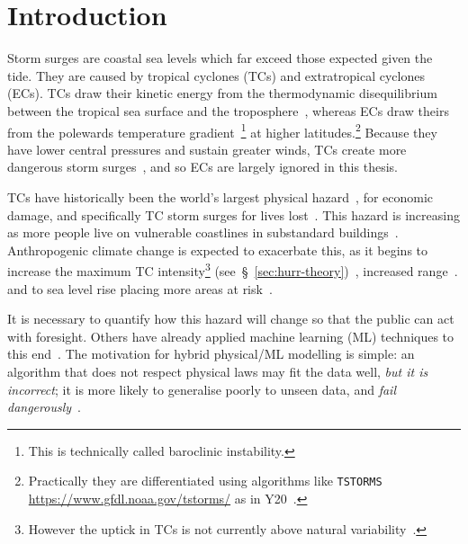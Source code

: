 \section{Introduction}
\label{sec:1_Introduction}


Storm surges are coastal sea levels which far exceed those
expected given the tide.
They are caused by tropical cyclones
(TCs) and extratropical cyclones (ECs).
TCs draw their kinetic energy from the thermodynamic disequilibrium between
the tropical sea surface and the
troposphere~\cite{emanuel1986air, emanuel1987dependence},
whereas ECs draw theirs from the
polewards temperature
gradient~\cite{lorenz1960energy, holton2004introduction}\footnote{
This is technically called baroclinic instability.} at higher latitudes.\footnote{
Practically they are differentiated using algorithms like \texttt{TSTORMS}
\url{https://www.gfdl.noaa.gov/tstorms/} as in Y20~\cite{ZannaPreprint}.}
Because they have lower central pressures and sustain greater winds,
TCs create more dangerous storm surges~\cite{emanuel2005divine},
and so ECs are largely ignored in this thesis.

TCs have historically been the
world's largest physical hazard~\cite{shultz2005epidemiology},
for economic damage,
and specifically TC storm surges for lives lost~\cite{emanuel2005divine,
shultz2005epidemiology, zhang2009tropical}.
This hazard is increasing as more people live on vulnerable coastlines
in substandard buildings~\cite{emanuel2005divine}.
Anthropogenic climate change is expected to exacerbate this,
as it begins to increase the maximum TC intensity\footnote{
However the uptick in TCs is not currently above
 natural variability~\cite{mendelsohn2012impact}.}
(see~§~\ref{sec:hurr-theory})~\cite{
emanuel2008hurricanes,emanuel2017will, nordhaus2010},
increased range~\cite{emanuel2008hurricanes, emanuel2017will, fedorov2010tropical}.
and to sea level rise placing more areas at risk~\cite{SROCC}.

It is necessary to quantify how this hazard will change
so that the public can act with foresight.
Others have already applied machine learning (ML) techniques to this
end~\cite{kulp2019new, kulp2018coastaldem, tadesse2020data}.
The motivation for hybrid physical/ML modelling is simple:
an algorithm that does not respect physical laws
may fit the data well, \textit{but it is incorrect};
it is more likely to generalise poorly to unseen data,
and \textit{fail dangerously}~\cite{beucler2019achieving}.



